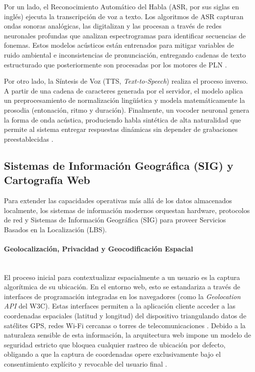 Por un lado, el Reconocimiento Automático del Habla (ASR, por sus siglas en inglés) ejecuta la transcripción de voz a texto. Los algoritmos de ASR capturan ondas sonoras analógicas, las digitalizan y las procesan a través de redes neuronales profundas que analizan espectrogramas para identificar secuencias de fonemas. Estos modelos acústicos están entrenados para mitigar variables de ruido ambiental e inconsistencias de pronunciación, entregando cadenas de texto estructurado que posteriormente son procesadas por los motores de PLN \cite{Yu2014}.

Por otro lado, la Síntesis de Voz (TTS, \textit{Text-to-Speech}) realiza el proceso inverso. A partir de una cadena de caracteres generada por el servidor, el modelo aplica un preprocesamiento de normalización lingüística y modela matemáticamente la prosodia (entonación, ritmo y duración). Finalmente, un vocoder neuronal genera la forma de onda acústica, produciendo habla sintética de alta naturalidad que permite al sistema entregar respuestas dinámicas sin depender de grabaciones preestablecidas \cite{Taylor2009}.

\subsection{Sistemas de Información Geográfica (SIG) y Cartografía Web}

Para extender las capacidades operativas más allá de los datos almacenados localmente, los sistemas de información modernos orquestan hardware, protocolos de red y Sistemas de Información Geográfica (SIG) para proveer Servicios Basados en la Localización (LBS).

\paragraph{Geolocalización, Privacidad y Geocodificación Espacial}\leavevmode \\

El proceso inicial para contextualizar espacialmente a un usuario es la captura algorítmica de su ubicación. En el entorno web, esto se estandariza a través de interfaces de programación integradas en los navegadores (como la \textit{Geolocation API} del W3C). Estas interfaces permiten a la aplicación cliente acceder a las coordenadas espaciales (latitud y longitud) del dispositivo triangulando datos de satélites GPS, redes Wi-Fi cercanas o torres de telecomunicaciones \cite{popescu_geolocation_2016}. Debido a la naturaleza sensible de esta información, la arquitectura web impone un modelo de seguridad estricto que bloquea cualquier rastreo de ubicación por defecto, obligando a que la captura de coordenadas opere exclusivamente bajo el consentimiento explícito y revocable del usuario final \cite{popescu_geolocation_2016}.


